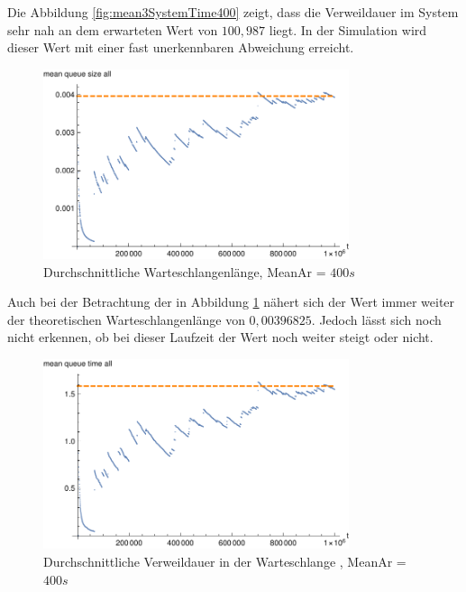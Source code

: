 Die Abbildung \ref{fig:mean3SystemTime400} zeigt, dass die Verweildauer im System sehr nah an dem erwarteten Wert von $100,987$ liegt. In der Simulation wird dieser Wert mit einer fast unerkennbaren Abweichung erreicht.

\begin{figure}[htpb]
	\centering
	\includegraphics[width=0.8\textwidth]{abbildungen/2_Phone_VIP/Arrival_400_Serve_100_dur_1000000_Skip_0/MeanQueueSizeAll.pdf}
	\caption{Durchschnittliche Warteschlangenlänge, MeanAr = $400s$}
	\label{fig:mean3QueueSize400}
\end{figure}

Auch bei der Betrachtung der in Abbildung \ref{fig:mean3QueueSize400} nähert sich der Wert immer weiter der theoretischen Warteschlangenlänge von $0,00396825$. Jedoch lässt sich noch nicht erkennen, ob bei dieser Laufzeit der Wert noch weiter steigt oder nicht.

\begin{figure}[htpb]
	\centering
	\includegraphics[width=0.8\textwidth]{abbildungen/2_Phone_VIP/Arrival_400_Serve_100_dur_1000000_Skip_0/MeanQueueTimeAll.pdf}
	\caption{Durchschnittliche Verweildauer in der Warteschlange , MeanAr = $400s$}
	\label{fig:mean3QueueTime400}
\end{figure} 

